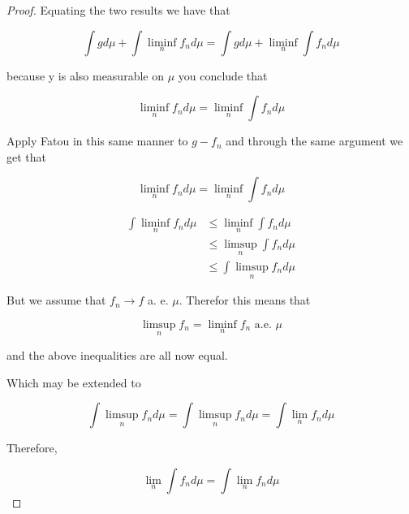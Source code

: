 \documentclass[11pt,fleqn]{book} %
\begin{document}
\begin{proof}
	Equating the two results we have that

			$$\int g d\mu + \int \liminf_n f_n d\mu = \int g d\mu + \liminf_n \int f_n d\mu $$

	because y is also measurable on $\mu$ you conclude that

			$$ \liminf_n f_n d\mu =  \liminf_n \int f_n d\mu$$

	Apply Fatou in this same manner to $g - f_n$ and through the same argument we get that

			$$ \liminf_n f_n d\mu =  \liminf_n \int f_n d\mu$$


	\begin{align*}
		\int \liminf_n f_n d\mu &\leq \liminf_n \int f_n d\mu\\
				&\leq \limsup_n \int f_n d\mu\\
				&\leq \int \limsup_n f_n d\mu
	\end{align*}

	But we assume that $f_n \rightarrow f$ a. e. $\mu$. Therefor this means that 

			$$\limsup_n f_n = \liminf_n f_n \text{ a.e. } \mu $$

	and the above inequalities are all now equal. 

	Which may be extended to

			$$ \int \limsup_n f_n d\mu = \int \limsup_n f_n d\mu = \int \lim_n f_n d\mu $$

	Therefore, 

			$$ \lim_n \int f_n d\mu = \int \lim_n f_n d\mu $$
 
\end{proof}
\end{document}

